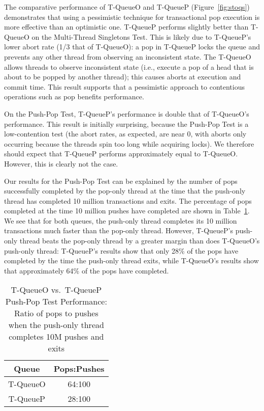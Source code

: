 The comparative performance of T-QueueO and T-QueueP (Figure~\ref{fig:stoqs}) demonstrates that using a pessimistic technique for transactional pop execution is more effective than an optimistic one. 
T-QueueP performs slightly better than T-QueueO on the Multi-Thread Singletons Test. This is likely due to T-QueueP's lower abort rate (1/3 that of T-QueueO): a pop in T-QueueP locks the queue and prevents any other thread from observing an inconsistent state. The T-QueueO allows threads to observe inconsistent state (i.e., execute a pop of a head that is about to be popped by another thread); this causes aborts at execution and commit time.
This result supports that a pessimistic approach to contentious operations such as pop benefits performance.

On the Push-Pop Test, T-QueueP's performance is double that of T-QueueO's performance. This result is initially surprising, because the Push-Pop Test is a low-contention test (the abort rates, as expected, are near 0, with aborts only occurring because the threads spin too long while acquiring locks). We therefore should expect that T-QueueP performs approximately equal to T-QueueO. However, this is clearly not the case.

Our results for the Push-Pop Test can be explained by the number of pops successfully completed by the pop-only thread at the time that the push-only thread has completed 10 million transactions and exits. The percentage of pops completed at the time 10 million pushes have completed are shown in Table~\ref{tab:sto_pop_push_ratio}.
We see that for both queues, the push-only thread completes its 10 million transactions much faster than the pop-only thread. However, T-QueueP's push-only thread beats the pop-only thread by a greater margin than does T-QueueO's push-only thread: T-QueueP's results show that only 28\% of the pops have completed by the time the push-only thread exits, while T-QueueO's results show that approximately 64\% of the pops have completed.

\begin{table}[t]
        \centering
    \begin{tabular}{|cc|}
        \hline
        Queue & Pops:Pushes\\
        \hline
            T-QueueO & 64:100\\
            T-QueueP & 28:100\\
        \hline
    \end{tabular}
    \caption{T-QueueO vs.\ T-QueueP Push-Pop Test Performance: Ratio of pops to pushes when the push-only thread completes 10M pushes and exits}
    \label{tab:sto_pop_push_ratio}
\end{table}

